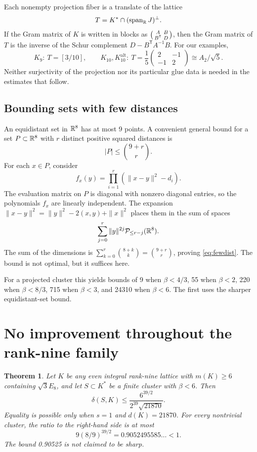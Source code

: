 \documentclass[11pt,a4paper]{article}
\newtheorem{theorem}{Theorem}[section]
\theoremstyle{remark}\newtheorem{remark}[theorem]{Remark}
\newcommand{\spanR}{\operatorname{span}_{\R}}\newcommand{\diag}{\operatorname{diag}}
\newcommand{\Kalt}{K_{10}^{\mathrm{alt}}}
\begin{document}
Each nonempty projection fiber is a translate of the lattice
\[
T=K^*\cap(\spanR J)^\perp.
\]
If the Gram matrix of $K$ is written in blocks as $\begin{psmallmatrix}A&B\\B^{\mathsf T}&D\end{psmallmatrix}$, then the Gram matrix of $T$ is the inverse of the Schur complement $D-B^{\mathsf T}A^{-1}B$. For our examples,
\begin{equation}\label{eq:fibers}
K_9:\ T=[3/10],\qquad
K_{10},\Kalt:\ T=\frac15\begin{pmatrix}2&-1\\-1&2\end{pmatrix}\cong A_2/\sqrt5.
\end{equation}
Neither surjectivity of the projection nor its particular glue data is needed in the estimates that follow.

\subsection{Bounding sets with few distances}

An equidistant set in $\mathbb R^8$ has at most 9 points. A convenient general bound for a set $P\subset\mathbb R^8$ with $r$ distinct positive squared distances is
\begin{equation}\label{eq:fewdist}
|P|\le\binom{9+r}{r}.
\end{equation}
For each $x\in P$, consider
\[
f_x(y)=\prod_{i=1}^r(\|x-y\|^2-d_i).
\]
The evaluation matrix on $P$ is diagonal with nonzero diagonal entries, so the polynomials $f_x$ are linearly independent. The expansion $\|x-y\|^2=\|y\|^2-2(x,y)+\|x\|^2$ places them in the sum of spaces
\[
\sum_{j=0}^r\|y\|^{2j}\mathcal P_{\le r-j}(\mathbb R^8).
\]
The sum of the dimensions is $\sum_{k=0}^r\binom{8+k}{k}=\binom{9+r}{r}$, proving \eqref{eq:fewdist}. The bound is not optimal, but it suffices here.

For a projected cluster this yields bounds of 9 when $\beta<4/3$, 55 when $\beta<2$, 220 when $\beta<8/3$, 715 when $\beta<3$, and 24310 when $\beta<6$. The first uses the sharper equidistant-set bound.

\section{No improvement throughout the rank-nine family}

\begin{theorem}\label{thm:cluster9}
Let $K$ be any even integral rank-nine lattice with $m(K)\ge6$ containing $\sqrt3E_8$, and let $S\subset K^*$ be a finite cluster with $\beta<6$. Then
\[
\delta(S,K)\le\frac{6^{39/2}}{2^{39}\sqrt{21870}}.
\]
Equality is possible only when $s=1$ and $d(K)=21870$. For every nontrivial cluster, the ratio to the right-hand side is at most
\[
9(8/9)^{39/2}=0.9052495585\ldots<1.
\]
The bound 0.90525 is not claimed to be sharp.
\end{theorem}
\end{document}
